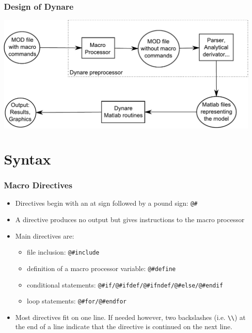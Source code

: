 \documentclass{beamer}
\begin{document}
\begin{frame}
  \frametitle{Design of Dynare}
  \includegraphics[width=0.95\linewidth]{new-design.pdf}
\end{frame}

\section{Syntax}

\begin{frame}[fragile=singleslide]
  \frametitle{Macro Directives}
  \begin{itemize}
  \item Directives begin with an at sign followed by a pound sign: \verb+@#+
  \item A directive produces no output but gives instructions to the macro processor
  \item Main directives are:
    \begin{itemize}
    \item file inclusion: \verb+@#include+
    \item definition of a macro processor variable: \verb+@#define+
    \item conditional statements: \verb+@#if/@#ifdef/@#ifndef/@#else/@#endif+
    \item loop statements: \verb+@#for/@#endfor+
    \end{itemize}
  \item Most directives fit on one line. If needed however, two backslashes (i.e. \verb+\\+) at the end of a line indicate that the directive is continued on the next line.
  \end{itemize}
\end{frame}
\end{document}
